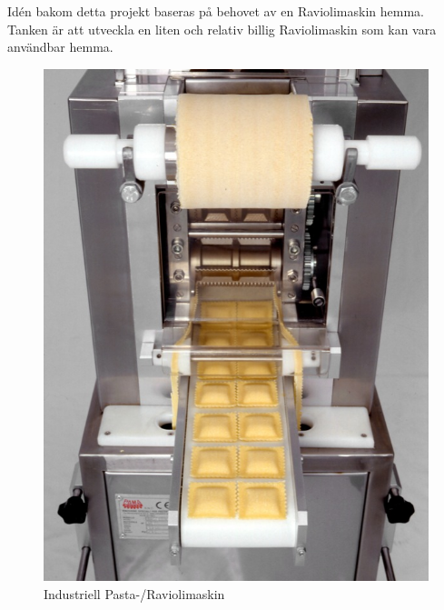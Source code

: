 Idén bakom detta projekt baseras på behovet av en Raviolimaskin hemma. Tanken är att utveckla en liten och relativ billig Raviolimaskin som kan vara användbar hemma.
 		\begin{figure}[h]
 			\begin{center}
 				\includegraphics[scale=3]{images/pastamachine.jpg}
 				\caption{Industriell Pasta-/Raviolimaskin}
 				\label{pastamaskin}	
 			\end{center}
 		\end{figure} 